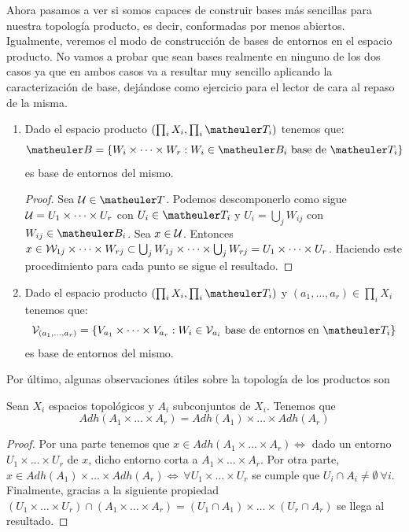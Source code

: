 Ahora pasamos a ver si somos capaces de construir bases más sencillas para nuestra topología producto, es decir, conformadas por menos abiertos. Igualmente, veremos el modo de construcción de bases de entornos en el espacio producto. No vamos a probar que sean bases realmente en ninguno de los dos casos ya que en ambos casos va a resultar muy sencillo aplicando la caracterización de base, dejándose como ejercicio para el lector de cara al repaso de la misma.
\begin{enumerate}
	\item Dado el espacio producto $(\prod_iX_i,\prod_i\T_i)$ tenemos que: \[\B=\{W_i\times\cdots\times W_r:W_i\in \B_i \text{ base de }\T_i\}\] es base de entornos del mismo.
	\begin{proof}
		Sea $\U \in \T$. Podemos descomponerlo como sigue $\mathcal{U} =U_1 \times \dots \times U_r $ con $U_i \in \T_i$ y $U_i = \bigcup_j W_{ij}$ con $W_{ij} \in \B_i$. Sea $x \in \mathcal{U}$. Entonces $x \in \mathcal{W}_{1j} \times \dots \times W_{rj} \subset \bigcup_j W_{1j} \times \dots \times \bigcup_j W_{rj} = U_1 \times \dots \times U_r$. Haciendo este procedimiento para cada punto se sigue el resultado.
	\end{proof}

	\item Dado el espacio producto $(\prod_iX_i,\prod_i\T_i)$ y $(a_1,\dots,a_r)\in\prod_iX_i$ tenemos que: \[\V_{(a_1,\dots,a_r)}=\{V_{a_1}\times\cdots\times V_{a_r}:W_i\in \V_{a_i} \text{ base de entornos en } \T_i\} \] es base de entornos del mismo.
\end{enumerate}

Por último, algunas observaciones útiles sobre la topología de los productos son
\begin{prop}[Adherencia]
	Sean $X_i$ espacios topológicos y $A_i$ subconjuntos de $X_i$. Tenemos que
	\[Adh(A_1 \times \dots \times A_r) = Adh(A_1) \times \dots \times Adh(A_r)\]
\end{prop}
\begin{proof}
	 Por una parte tenemos que $x \in Adh(A_1 \times \dots \times A_r) \iff$ dado un entorno $U_1 \times \dots \times U_r$ de $x$, dicho entorno corta a $A_1 \times \dots \times A_r$.
	 Por otra parte, $x \in  Adh(A_1) \times \dots \times Adh(A_r) \iff \ \forall U_1 \times \dots \times U_r $ se cumple que $U_i \cap A_i \neq \emptyset \ \forall i$.
	 Finalmente, gracias a la siguiente propiedad $(U_1 \times \dots \times U_r) \cap (A_1 \times \dots \times A_r) = (U_1 \cap A_1) \times \dots \times (U_r \cap A_r)$ se llega al resultado.
\end{proof}

